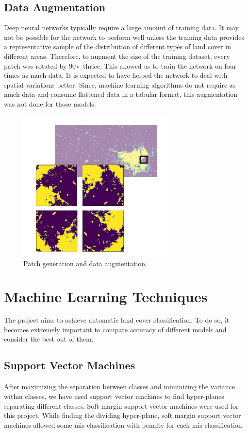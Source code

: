\documentclass[12pt, a4paper]{report}
\begin{document}
\subsection{Data Augmentation}
Deep neural networks typically require a large amount of training data. It may not be possible for the network to perform well unless the training data provides a representative sample of the distribution of different types of land cover in different areas. Therefore, to augment the size of the training dataset, every patch was rotated by $90\circ$ thrice. This allowed us to train the network on four times as much data. It is expected to have helped the network to deal with spatial variations better. Since, machine learning algorithms do not require as much data and consume flattened data in a tabular format, this augmentation was not done for those models.
\begin{figure}[h]
\centering
\includegraphics[width=0.7\textwidth]{dataaug.jpg}
\caption{Patch generation and data augmentation.}
\end{figure}
\section{Machine Learning Techniques}
The project aims to achieve automatic land cover classification. To do so, it becomes extremely important to compare accuracy of different models and  consider the best out of them.
\subsection{Support Vector Machines}
\paragraph{}
After maximizing the separation between classes and minimizing the variance within classes, we have used support vector machines to find hyper-planes separating different classes. Soft margin support vector machines were used for this project. While finding the dividing hyper-plane, soft margin support vector machines allowed some mis-classification with penalty for each mis-classification. 
\end{document}
